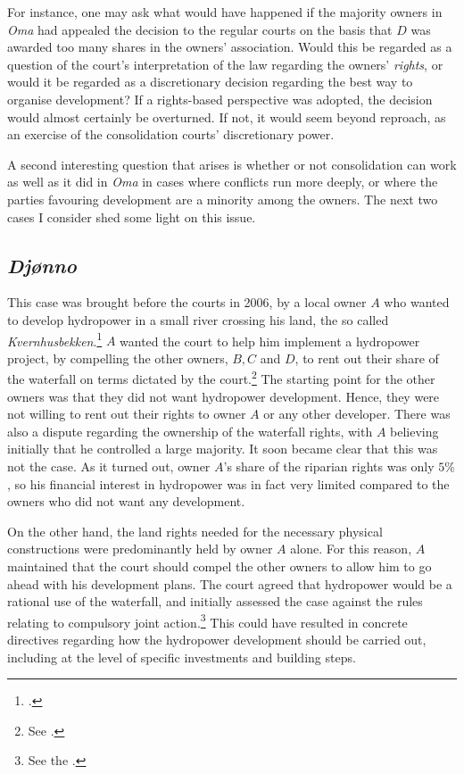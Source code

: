 For instance, one may ask what would have happened if the majority owners in \emph{Oma} had appealed the decision to the regular courts on the basis that $D$ was awarded too many shares in the owners' association. Would this be regarded as a question of the court's interpretation of the law regarding the owners' \emph{rights}, or would it be regarded as a discretionary decision regarding the best way to organise development? If a rights-based perspective was adopted, the decision would almost certainly be overturned. If not, it would seem beyond reproach, as an exercise of the consolidation courts' discretionary power.

A second interesting question that arises is whether or not consolidation can work as well as it did in \emph{Oma} in cases where conflicts run more deeply, or where the parties favouring development are a minority among the owners. The next two cases I consider shed some light on this issue.

\subsection{\emph{Djønno}}\label{sec:6:4:3}

This case was brought before the courts in 2006, by a local owner $A$ who wanted to develop hydropower in a small river crossing his land, the so called \emph{Kvernhusbekken}.\footcite{djonno06} $A$ wanted the court to help him implement a hydropower project, by compelling the other owners, $B, C$ and $D$, to rent out their share of the waterfall on terms dictated by the court.\footnote{See \cite[28-31]{stokstad11}.} The starting point for the other owners was that they did not want hydropower development. Hence, they were not willing to rent out their rights to owner $A$ or any other developer. There was also a dispute regarding the ownership of the waterfall rights, with $A$ believing initially that he controlled a large majority. It soon became clear that this was not the case. As it turned out, owner $A$'s share of the riparian rights was only $5 \%$, so his financial interest in hydropower was in fact very limited compared to the owners who did not want any development.

On the other hand, the land rights needed for the necessary physical constructions were predominantly held by owner $A$ alone. For this reason, $A$ maintained that the court should compel the other owners to allow him to go ahead with his development plans. The court agreed that hydropower would be a rational use of the waterfall, and initially assessed the case against the rules relating to compulsory joint action.\footnote{See the \dni\cite[2 e)]{lca79}.} This could have resulted in concrete directives regarding how the hydropower development should be carried out, including at the level of specific investments and building steps.

